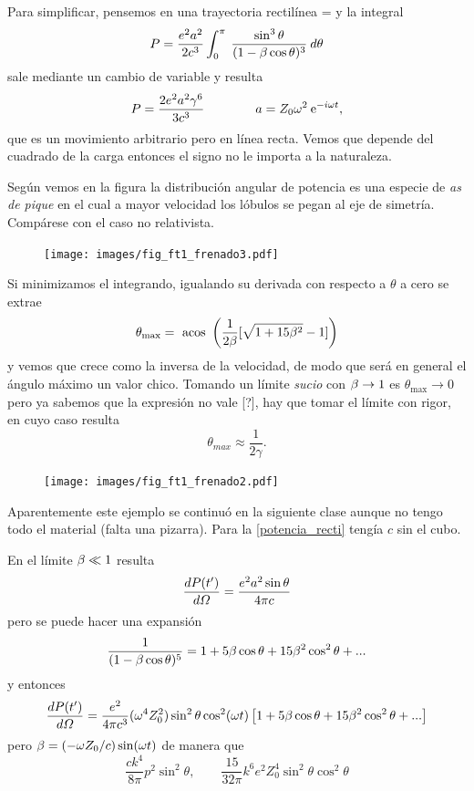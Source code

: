 \documentclass[10pt,oneside]{CBFT_book}
\begin{document}
Para simplificar, pensemos en una trayectoria rectilínea
\be
	 =   
	\label{potencia_recti}
\ee
y la integral
\[
	P = \frac{e^2 a^2}{2c^3} \int_0^\pi \: \frac{\sin^3\theta}{(1-\beta\cos\theta)^3} \: d\theta
\]
sale mediante un cambio de variable y resulta
\[
	P = \frac{2 e^2 a^2 \gamma^6}{3 c^3} \qquad \qquad a = Z_0 \omega^2 \:\mathrm{e}^{-i \omega t},
\]
que es un movimiento arbitrario pero en línea recta. Vemos que depende del cuadrado de la
carga entonces el signo no le importa a la naturaleza.

Según vemos en la figura la distribución angular de potencia es una especie de {\it as de pique} en el cual
a mayor velocidad los lóbulos se pegan al eje de simetría. Compárese con el caso no relativista.

\begin{figure}[htb]
	\begin{center}
	\texttt{[image: images/fig\_ft1\_frenado3.pdf]}	 
	\end{center}
	\caption{}
\end{figure} 

Si minimizamos el integrando, igualando su derivada con respecto a $\theta$ a cero se extrae
\[
	\theta_\text{max} = \text{ acos } \left( \frac{1}{2\beta} [ \sqrt{ 1 + 15\beta^2 } - 1 ] \right)
\]
y vemos que crece como la inversa de la velocidad, de modo que será en general el ángulo
máximo un valor chico. Tomando un límite {\it sucio} con $\beta \to 1$ es $\theta_\text{max} \to 0$
pero ya sabemos que la expresión no vale [?], hay que tomar el límite con rigor, en cuyo 
caso resulta 
\[
	\theta_{max} \approx \frac{1}{2\gamma}.
\]

\begin{figure}[htb]
	\begin{center}
	\texttt{[image: images/fig\_ft1\_frenado2.pdf]}	 
	\end{center}
	\caption{}
\end{figure} 

Aparentemente este ejemplo se continuó en la siguiente clase aunque no tengo todo el material
(falta una pizarra). Para la \eqref{potencia_recti} tengía $c$ sin el cubo.

En el límite $\beta \ll 1$ resulta
\[
	\frac{d^{\hspace{-0.05em}} {P(t')}}{d {\Omega}^{\hspace{-0.05em}}} = \frac{e^2 a^2 \sin\theta }{ 4 \pi c }
\]
pero se puede hacer una expansión
\[
	\frac{1}{( 1 - \beta\cos\theta )^5} = 1 + 5\beta\cos\theta + 15\beta^2\cos^2\theta + ...
\]
y entonces
\[
	\frac{d^{\hspace{-0.05em}} {P(t')}}{d {\Omega}^{\hspace{-0.05em}}} = \frac{e^2}{4 \pi c^3} (\omega^4Z_0^2)
	\sin^2\theta\cos^2(\omega t) \left[ 
	1 + 5 \beta \cos\theta + 15\beta^2\cos^2\theta + ...
	\right] 
\]
pero $\beta = (-\omega Z_0/c) \sin(\omega t)$ de manera que 
\[
	\frac{c k^4}{8\pi} p^2 \sin^2\theta, 
	\qquad \frac{15}{32\pi} k^6 e^2 Z_0^4 \sin^2\theta \cos^2\theta
\]
\end{document}
